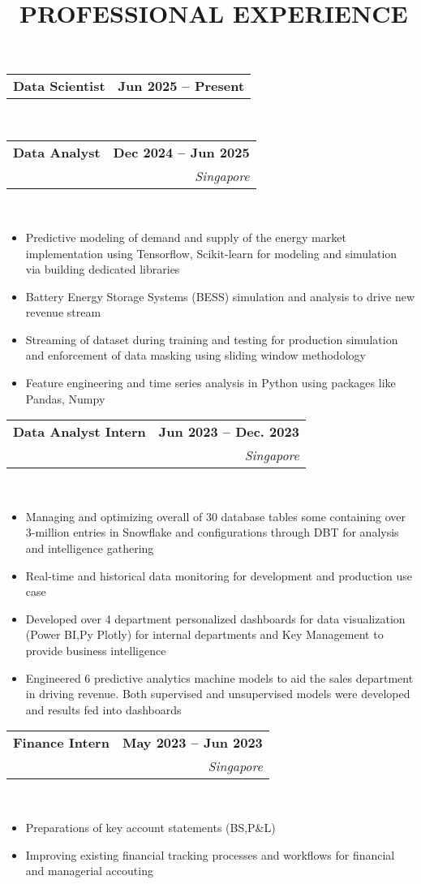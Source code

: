\documentclass[10pt,a4paper]{article}
\makeatletter
\newcommand{\cvsectionfontsize}{11}       %
\newcommand{\cvtaglinefirstfontsize}{11}  %
\newcommand{\cvtaglinesecondfontsize}{10} %
\newcommand{\cvbulletfontsize}{10}        %
\newcommand{\cvsection}[3][.2em]{
  \vspace{-2.7em} %
  \section[#3]{\textbf{\scalebox{.68}{\faIcon{#2}}~\fontsize{\cvsectionfontsize}{\cvsectionfontsize}\selectfont\MakeUppercase{#3}}}
  \vspace{-1.8em}
  \noindent\makebox[\textwidth]{\rule{\textwidth}{0.4pt}}
  \\
  \vspace{#1} %
}
\newcommand{\cvtagline}[5][1em]{
  \vspace{-1em} %
  \noindent\begin{tabularx}{\textwidth}{@{}Xr@{}}
    {\fontsize{\cvtaglinefirstfontsize}{\cvtaglinefirstfontsize}\selectfont\textbf{#2}} & 
    {\fontsize{\cvtaglinefirstfontsize}{\cvtaglinefirstfontsize}\selectfont\textbf{#3}} \\ %
    {\fontsize{\cvtaglinesecondfontsize}{\cvtaglinesecondfontsize}\selectfont{#4}} & 
    {\fontsize{\cvtaglinesecondfontsize}{\cvtaglinesecondfontsize}\selectfont\textit{#5}} \\ %
  \end{tabularx}
  \\
  \vspace{#1} %
}
\newcommand{\cvsingletagline}[3][1em]{
  \vspace{-1em} %
  \noindent\begin{tabularx}{\textwidth}{@{}Xr}
    {\fontsize{\cvtaglinefirstfontsize}{\cvtaglinefirstfontsize}\selectfont\textbf{#2}} & 
    {\fontsize{\cvtaglinefirstfontsize}{\cvtaglinefirstfontsize}\selectfont\textbf{#3}} \\ %
  \end{tabularx}
  \\
  \vspace{#1} %
}
\newcommand{\cvbullets}[2][1em]{
  \vspace{-2.1em} %
  {\fontsize{\cvbulletfontsize}{\cvbulletfontsize}\selectfont
    \begin{itemize}[left=0pt,labelsep=1em]
      \setlength\itemsep{0.2em} %
      \setlength\labelwidth{1em} %
      \setlength\parskip{0pt} %
      #2
    \end{itemize}
  }
  \vspace{#1} %
}
\makeatother
\begin{document}
\cvsection{briefcase}{Professional Experience}

\cvsingletagline{Data Scientist}{Jun 2025 -- Present}{}{}

\vspace{-1em}

\cvtagline{Data Analyst}{Dec 2024 -- Jun 2025}{Flo Energy Pte Ltd $ | $ Supervisor: Nils Trepstra [Head of Data \& Analytics]}{Singapore}

\cvbullets{
  \item Predictive modeling of demand and supply of the energy market implementation using Tensorflow, Scikit-learn for modeling and simulation via building dedicated libraries
  \item Battery Energy Storage Systems (BESS) simulation and analysis to drive new revenue stream
  \item Streaming of dataset during training and testing for production simulation and enforcement of data masking using sliding window methodology
  \item Feature engineering and time series analysis in Python using packages like Pandas, Numpy }

\cvtagline{Data Analyst Intern}{Jun 2023 -- Dec. 2023}{ADDX Pte Ltd $ | $ Supervisor: Yogesh Bharadwaj [Data team lead]}{Singapore}

\cvbullets{
  \item Managing and optimizing overall of 30 database tables some containing over
  3-million entries in Snowflake and configurations through DBT for analysis and
  intelligence gathering
  \item Real-time and historical data monitoring for development and production use
  case
  \item Developed over 4 department personalized dashboards for data visualization
  (Power BI,Py Plotly) for internal departments and Key Management to provide
  business intelligence
  \item Engineered 6 predictive analytics machine models to aid the sales department in
  driving revenue. Both supervised and unsupervised models were developed and
  results fed into dashboards }

\cvtagline{Finance Intern}{May 2023 -- Jun 2023}{Wiz.AI Pte Ltd $ | $ Supervisor: Andy Teo [Finance director]}{Singapore}

\cvbullets{
  \item Preparations of key account statements (BS,P\&L)
  \item Improving existing financial tracking processes and workflows for financial and
  managerial accouting }
\end{document}

